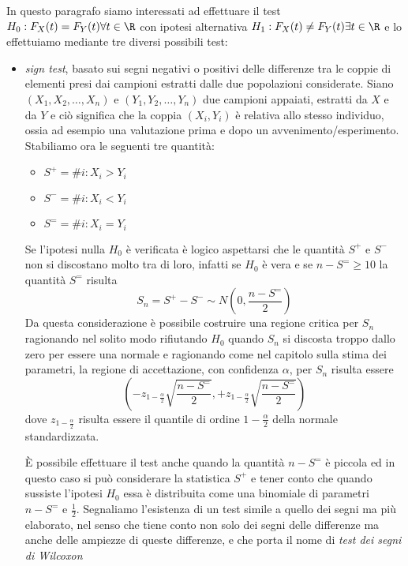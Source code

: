 In questo paragrafo siamo interessati ad effettuare il test $H_0:F_X(t) = F_Y(t) \forall t \in \R$ con ipotesi
alternativa $H_1:F_X(t) \neq F_Y(t) \exists t \in \R$ e lo effettuiamo mediante tre diversi possibili test:
\begin{itemize}
    \item \emph{sign test}, basato sui segni negativi o positivi delle differenze tra le coppie di elementi
          presi dai campioni estratti dalle due popolazioni considerate.\newline
          Siano $(X_1, X_2, \dots, X_n)$ e $(Y_1, Y_2, \dots, Y_n)$ due campioni appaiati, estratti da $X$ e da $Y$ e
          ciò significa che la coppia $(X_i, Y_i)$ è relativa allo stesso individuo, ossia ad esempio una valutazione
          prima e dopo un avvenimento/esperimento.\newline
          Stabiliamo ora le seguenti tre quantità:
          \begin{itemize}
              \item $S^+ = \#i : X_i > Y_i$
              \item $S^- = \#i : X_i < Y_i$
              \item $S^= = \#i : X_i = Y_i$
          \end{itemize}
          Se l'ipotesi nulla $H_0$ è verificata è logico aspettarsi che le quantità $S^+$ e $S^-$ non si discostano
          molto tra di loro, infatti se $H_0$ è vera e se $n - S^= \geq 10$ la quantità $S^=$ risulta
          \[ S_n = S^+ - S^- \sim N(0, \frac{n - S^=}{2}) \]
          Da questa considerazione è possibile costruire una regione critica per $S_n$ ragionando nel solito modo 
          rifiutando $H_0$ quando $S_n$ si discosta troppo dallo zero per essere una normale e ragionando come nel
          capitolo sulla stima dei parametri, la regione di accettazione, con confidenza $\alpha$, per $S_n$ risulta essere
          \[ (-z_{1 - \frac{\alpha}{2}} \sqrt{\frac{n - S^=}{2}}, +z_{1 - \frac{\alpha}{2}} \sqrt{\frac{n - S^=}{2}}) \]
          dove $z_{1 - \frac{\alpha}{2}}$ risulta essere il quantile di ordine $1 - \frac{\alpha}{2}$ della normale standardizzata.
          
          È possibile effettuare il test anche quando la quantità $n - S^=$ è piccola ed in questo caso si può considerare
          la statistica $S^+$ e tener conto che quando sussiste l'ipotesi $H_0$ essa è distribuita come una binomiale di
          parametri $n - S^=$ e $\frac{1}{2}$.\newline
          Segnaliamo l’esistenza di un test simile a quello dei segni ma più elaborato, nel senso che tiene conto 
          non solo dei segni delle differenze ma anche delle ampiezze di queste differenze, e che porta il nome di
          \emph{test dei segni di Wilcoxon}
    

\end{itemize}
